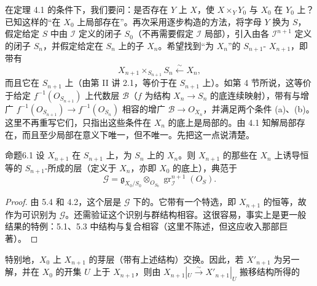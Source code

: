 在定理 4.1 的条件下，我们要问：是否存在 $Y$ 上 $X$，使 $X\times_Y Y_0$ 与 $X_0$ 在 $Y_0$ 上？已知这样的“在 $X_0$ 上局部存在”。再次采用逐步构造的方法，将字母 $Y$ 换为 $S$，假定给定 $S$ 中由 $\mathcal I$ 定义的闭子 $S_0$（不再需要假定 $\mathcal I$ 局部），引入由各 $\mathcal I^{n+1}$ 定义的闭子 $S_n$，并假定给定在 $S_n$ 上的子 $X_n$。希望找到“为 $X_n$”的 $S_{n+1}$- $X_{n+1}$，即带有
\[X_{n+1}\times_{S_{n+1}}S_n\xleftarrow{\sim}X_n,\]
而且它在 $S_{n+1}$ 上（由第 II 讲 2.1，等价于在 $S_{n+1}$ 上）。如第 4 节所说，这等价于给定 $f^{-1}(O_{S_{n+1}})$ 上代数层 $\mathcal B$（$f$ 为结构 $X_n\to S_n$ 的底连续映射），带有与增广 $f^{-1}(O_{S_{n+1}})\to f^{-1}(O_{S_n})$ 相容的增广 $\mathcal B\to O_{X_n}$，并满足两个条件 (a)、(b)。这里不再重写它们，只指出这些条件在 $X_n$ 的底上是局部的。由 4.1 知解局部存在，而且至少局部在意义下唯一，但不唯一。先把这一点说清楚。
\begin{SGAresult}{命题}{6.1}
设 $X_{n+1}$ 在 $S_{n+1}$ 上，为 $S_n$ 上的 $X_n$。则 $X_{n+1}$ 的那些在 $X_n$ 上诱导恒等的 $S_{n+1}$-所成的层（定义于 $X_n$，亦即 $X_0$ 的底上），典范于
\[\mathcal G=\mathfrak g_{X_0/S_0}\otimes_{O_{S_0}}\operatorname{gr}^{n+1}_{\mathcal I}(O_S).\]
\end{SGAresult}
\begin{proof}
由 5.4 和 4.2，这个层是 $\mathcal G$ 下的。它带有一个特选，即 $X_{n+1}$ 的恒等，故作为可识别为 $\mathcal G$。还需验证这个识别与群结构相容。这很容易，事实上是更一般结果的特例：5.1、5.3 中结构与复合相容（这里不陈述，但这应收入那部巨著）。
\end{proof}
特别地，$X_0$ 上 $X_{n+1}$ 的芽层（带有上述结构）交换。因此，若 $X'_{n+1}$ 为另一解，并在 $X_0$ 的开集 $U$ 上于 $X_{n+1}$，则由 $X_{n+1}|_U\xrightarrow{\sim}X'_{n+1}|_U$ 搬移结构所得的
